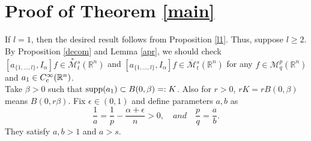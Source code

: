 \documentclass[11pt,a4]{article}
\numberwithin{equation}{section}
\theoremstyle{definition}
\theoremstyle{remark}
\begin{document}
\section{Proof of Theorem \ref{main}}
If $l=1$, then the desired result follows from Proposition \ref{l1}. Thus, suppose  $l \ge 2$.\\
By Proposition \ref{decom} and Lemma \ref{apr}, we should check $[a_{\{1, ... , l\}},I_{\alpha}]f \in \overset{*}{{\mathcal M}}{}^s_t({\mathbb R}^n)$ and $[a_{\{1, ... , l\}},I_{\alpha}]f \in \overline{{\mathcal M}}{}^s_t({\mathbb R}^n)$ for any $f \in {\mathcal M}^{p}_q({\mathbb R}^n)$ and $a_1 \in C^\infty_{\rm c}({\mathbb R}^n)$.\\
Take $\beta>0$ such that ${\rm supp}(a_1) \subset B(0,\beta)=:K$. Also for $r>0$, $rK=rB(0,\beta)$ means $B(0,r\beta)$.  Fix $\epsilon \in (0,1)$ and define parameters $a,b$ as \\
\[
	\frac{1}{a}=\frac{1}{p}-\frac{\alpha+\epsilon}{n}>0, \quad and \quad \frac{p}{q}=\frac{a}{b}.
\]
They satisfy $a,b > 1$ and $a > s$. 
\end{document}
